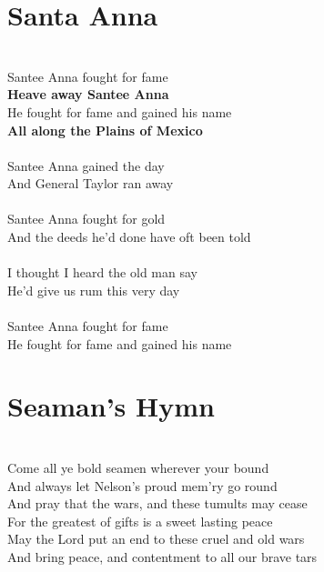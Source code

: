 \documentclass[letterpaper,9pt]{article}
\begin{document}
\section{Santa Anna}
\noindent
\\Santee Anna fought for fame
\\\textbf{Heave away Santee Anna}
\\He fought for fame and gained his name
\\\textbf{All along the Plains of Mexico}
\\
\\Santee Anna gained the day
\\And General Taylor ran away
\\
\\Santee Anna fought for gold
\\And the deeds he'd done have oft been told
\\
\\I thought I heard the old man say
\\He'd give us rum this very day
\\
\\Santee Anna fought for fame
\\He fought for fame and gained his name

\section{Seaman's Hymn}
\noindent
\\Come all ye bold seamen wherever your bound
\\And always let Nelson's proud mem'ry go round
\\And pray that the wars, and these tumults may cease
\\For the greatest of gifts is a sweet lasting peace
\\May the Lord put an end to these cruel and old wars
\\And bring peace, and contentment to all our brave tars
\end{document}
